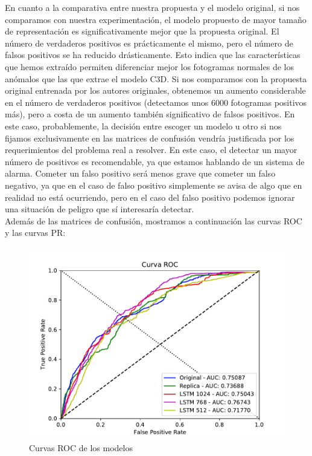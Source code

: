 \documentclass[../main.tex]{memoir}
\begin{document}
En cuanto a la comparativa entre nuestra propuesta y el modelo
original, si nos comparamos con nuestra experimentación, el modelo
propuesto de mayor tamaño de representación es significativamente
mejor que la propuesta original. El número de verdaderos positivos es
prácticamente el mismo, pero el número de falsos positivos se ha
reducido drásticamente. Esto indica que las características que hemos
extraído permiten diferenciar mejor los fotogramas normales de los
anómalos que las que extrae el modelo C3D. Si nos comparamos con la
propuesta original entrenada por los autores originales, obtenemos un
aumento considerable en el número de verdaderos positivos (detectamos
unos 6000 fotogramas positivos más), pero a costa de un aumento
también significativo de falsos positivos. En este caso,
probablemente, la decisión entre escoger un modelo u otro si nos
fijamos exclusivamente en las matrices de confusión vendría
justificada por los requerimientos del problema real a resolver.  En
este caso, el detectar un mayor número de positivos es recomendable,
ya que estamos hablando de un sistema de alarma.  Cometer un falso
positivo será menos grave que cometer un falso negativo, ya que en el
caso de falso positivo simplemente se avisa de algo que en realidad no
está ocurriendo, pero en el caso del falso positivo podemos ignorar
una situación de peligro que sí interesaría detectar.\\

Además de las matrices de confusión, mostramos a continuación las
curvas ROC y las curvas PR:

\begin{figure}[H]
  \centering
  \includegraphics[width=.8\textwidth]{images/roc_overlay.pdf}
  \caption{Curvas ROC de los modelos}
  \label{fig:roc-curves-experiments}
\end{figure}
\end{document}
